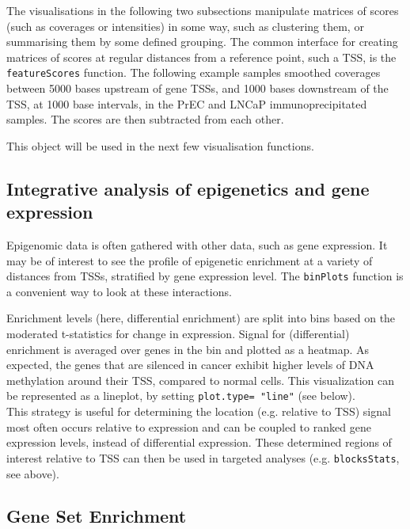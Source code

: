 \documentclass[a4paper, 12pt]{article}
\begin{document}
The visualisations in the following two subsections manipulate matrices of scores (such as coverages or intensities) in some way, such as clustering them, or summarising them by some defined grouping. The common interface for creating matrices of scores at regular distances from a reference point, such a TSS, is the \texttt{featureScores} function. The following example samples smoothed coverages between 5000 bases upstream of gene TSSs, and 1000 bases downstream of the TSS, at 1000 base intervals, in the PrEC and LNCaP immunoprecipitated samples. The scores are then subtracted from each other.



This object will be used in the next few visualisation functions.

\subsection{Integrative analysis of epigenetics and gene expression}
\noindent Epigenomic data is often gathered with other data, such as gene expression. It may be of interest to see the profile of epigenetic enrichment at a variety of distances from TSSs, stratified by gene expression level. The \texttt{binPlots} function is a convenient way to look at these interactions.



\noindent Enrichment levels (here, differential enrichment) are split into bins based on the moderated t-statistics for change in expression.  Signal for (differential) enrichment is averaged over genes in the bin and plotted as a heatmap.  As expected, the genes that are silenced in cancer exhibit higher levels of DNA methylation around their TSS, compared to normal cells.  This visualization can be represented as a lineplot, by setting \texttt{plot.type= "line"} (see below). \\



This strategy is useful for determining the location (e.g. relative to TSS) signal most often occurs relative to expression and can be coupled to ranked gene expression levels, instead of differential expression.  These determined regions of interest relative to TSS can then be used in targeted analyses (e.g. \texttt{blocksStats}, see above).

\subsection{Gene Set Enrichment}
\end{document}
